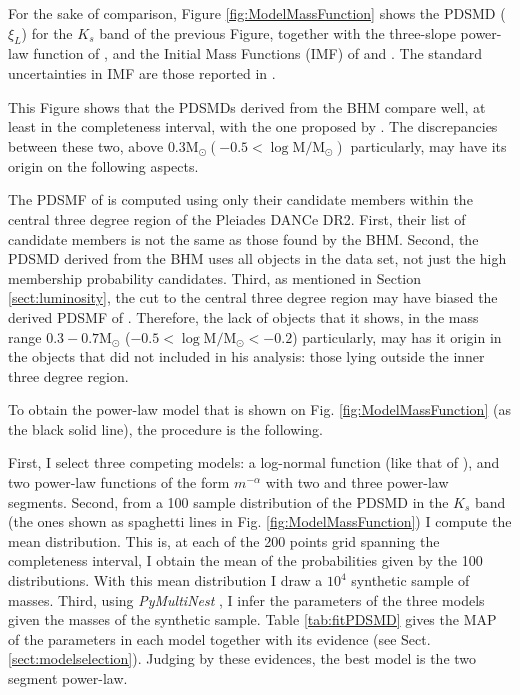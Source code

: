 For the sake of comparison, Figure \ref{fig:ModelMassFunction} shows the PDSMD ($\xi_L$) for the $K_s$ band of the previous Figure, together with the three-slope power-law function of \citet{Bouy2015}, and the Initial Mass Functions (IMF) of \citet{Thies2007} and \citet{Chabrier2005}. The standard uncertainties in \citet{Chabrier2005} IMF are those reported in \citet{Chabrier2003b}. 

This Figure shows that the PDSMDs derived from the BHM compare well, at least in the completeness interval, with the one proposed by \citet{Bouy2015}. The discrepancies between these two, above $0.3 \mathrm{M_{\odot}} (-0.5 < \log \mathrm{M/M_{\odot}})$ particularly, may have its origin on the following aspects.

The PDSMF of \citet{Bouy2015} is computed using only their candidate members within the central three degree region of the Pleiades DANCe DR2. First, their list of candidate members is not the same as those found by the BHM. Second, the PDSMD derived from the BHM uses all objects in the data set, not just the high membership probability candidates. Third, as mentioned in Section \ref{sect:luminosity}, the cut to the central three degree region may have biased the derived PDSMF of \citet{Bouy2015}. Therefore, the lack of objects that it shows,  in the mass range $0.3 - 0.7 \mathrm{M_{\odot}}$ ($-0.5 < \log \mathrm{M/M_{\odot}} < -0.2$) particularly, may has it origin in the objects that \citet{Bouy2015} did not included in his analysis: those lying outside the inner three degree region. 

To obtain the power-law model that is shown on Fig. \ref{fig:ModelMassFunction} (as the black solid line), the procedure is the following. 

First, I select three competing models: a log-normal function (like that of \citet{Chabrier2003b,Chabrier2005}), and two power-law functions of the form $m^{-\alpha}$ with two and three power-law segments. Second, from a 100 sample distribution of the PDSMD in the $K_s$ band (the ones shown as spaghetti lines in Fig. \ref{fig:ModelMassFunction}) I compute the mean distribution. This is, at each of the 200 points grid spanning the completeness interval, I obtain the mean of the probabilities given by the 100 distributions. With this mean distribution I draw a $10^4$ synthetic sample of masses. Third, using \emph{PyMultiNest} \citep{Buchner2014}, I infer the parameters of the three models given the masses of the synthetic sample. Table \ref{tab:fitPDSMD} gives the MAP of the parameters in each model together with its evidence (see Sect. \ref{sect:modelselection}). Judging by these evidences, the best model is the two segment power-law. 

